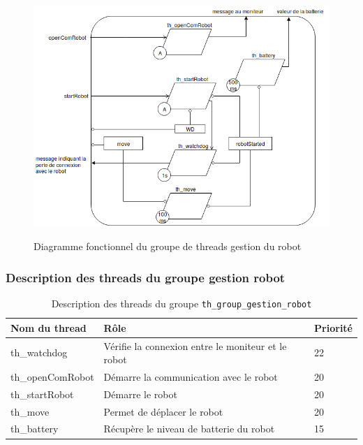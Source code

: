 \documentclass[11pt, a4paper]{paper}
\begin{document}
\begin{figure}[htp]
\label{fig:act_communiquer}
\begin{center}
{\includegraphics[scale=.4]{./dossier_conception/diag_fonc_robot.png}}
{\caption{Diagramme fonctionnel du groupe de threads gestion du robot}}
\end{center}
\end{figure}

\subsubsection{Description des threads du groupe gestion robot}

\begin{table}[htp]
\caption{Description des threads du groupe {\tt th\_group\_gestion\_robot}}
\begin{center}
\begin{tabular}{|p{3cm}|p{8.5cm}|p{2cm}|}
\hline
\bf Nom du thread &	\bf Rôle &	\bf Priorité \\
\hline
\hline
\color{blue}th\_watchdog	& \color{blue}Vérifie la connexion entre le moniteur et le robot & \color{blue}22\\
\hline
\color{blue}th\_openComRobot	& \color{blue}Démarre la communication avec le robot & \color{blue}20\\
\hline
\color{blue}th\_startRobot	& \color{blue}Démarre le robot & \color{blue}20\\
\hline
\color{blue}th\_move	& \color{blue}Permet de déplacer le robot & \color{blue}20\\
\hline
\color{blue}th\_battery	& \color{blue}Récupère le niveau de batterie du robot & \color{blue}15\\
\hline
\end{tabular}
\end{center}
\label{tab:gt_moniteur}
\end{table}%
\FloatBarrier
\end{document}

